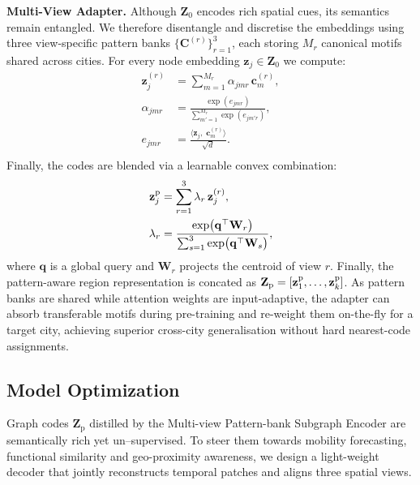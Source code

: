 \textbf{Multi-View Adapter.}
Although $\mathbf Z_{0}$ encodes rich spatial cues, its semantics remain entangled. We therefore disentangle and discretise the embeddings using three view-specific pattern banks $\{\mathbf C^{(r)}\}_{r=1}^{3}$, each storing $M_r$ canonical motifs shared across cities. For every node embedding $\mathbf z_{j}\in\mathbf Z_{0}$ we compute:
\begin{equation}
    \begin{aligned}
    \mathbf z^{(r)}_j &= \sum_{m=1}^{M_r} \alpha_{jmr}\, \mathbf c^{(r)}_m,\\
    \alpha_{jmr}&= \frac{\exp(e_{jmr})}{\sum_{m'=1}^{M_r}\exp(e_{jm'r})},\\
    e_{jmr}&= \frac{\bigl\langle\mathbf z_j,\;\mathbf c^{(r)}_m\bigr\rangle}{\sqrt d}.\\
    \end{aligned}
\end{equation}
Finally, the codes are blended via a learnable convex combination:
\begin{equation}
    \begin{aligned}
        \mathbf z^{\text p}_j &= \sum_{r=1}^{3} \lambda_r\, \mathbf z^{(r)}_j,\\
        \lambda_r &= \frac{\exp\bigl(\mathbf q^\top \mathbf W_r\bigr)}{\sum_{s=1}^{3}\exp\bigl(\mathbf q^\top \mathbf W_s\bigr)},
    \end{aligned}
\end{equation}
where $\mathbf q$ is a global query and $\mathbf W_{r}$ projects the centroid of view $r$. Finally, the pattern-aware region representation is concated as $\mathbf Z_{\text p}=[\mathbf z^{\text p}_{1},\dots,\mathbf z^{\text p}_{k}]$. As pattern banks are shared while attention weights are input-adaptive, the adapter can absorb transferable motifs during pre-training and re-weight them on-the-fly for a target city, achieving superior cross-city generalisation without hard nearest-code assignments.

\subsection{Model Optimization}

Graph codes $\mathbf Z_{\mathrm p}$ distilled by the Multi-view Pattern-bank Subgraph Encoder are semantically rich yet un–supervised. To steer them towards mobility forecasting, functional similarity and geo-proximity awareness, we design a light-weight decoder that jointly reconstructs temporal patches and aligns three spatial views.

